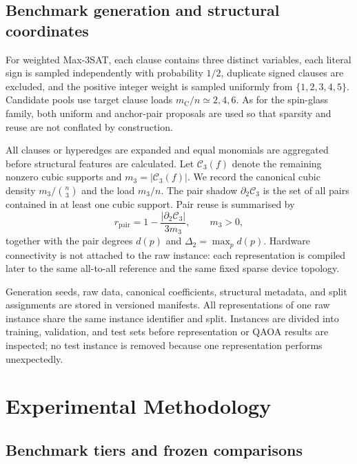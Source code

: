 \documentclass[a4paper,onecolumn,11pt,unpublished]{quantumarticle}
\theoremstyle{remark}
\begin{document}
\subsection{Benchmark generation and structural coordinates}
\label{sec:benchmark-generation}

For weighted Max-3SAT, each clause contains three distinct variables, each
literal sign is sampled independently with probability $1/2$, duplicate signed
clauses are excluded, and the positive integer weight is sampled uniformly from
$\{1,2,3,4,5\}$.  Candidate pools use target clause loads
$m_{\mathrm C}/n\simeq2,4,6$.  As for the spin-glass family, both uniform and
anchor-pair proposals are used so that sparsity and reuse are not conflated by
construction.

All clauses or hyperedges are expanded and equal monomials are aggregated
before structural features are calculated.  Let $\mathcal C_3(f)$ denote the
remaining nonzero cubic supports and $m_3=|\mathcal C_3(f)|$.  We record the
canonical cubic density $m_3/\binom{n}{3}$ and the load $m_3/n$.  The pair shadow
$\partial_2\mathcal C_3$ is the set of all pairs contained in at least one
cubic support.  Pair reuse is summarised by
\begin{equation}
  r_{\mathrm{pair}}
  =1-\frac{|\partial_2\mathcal C_3|}{3m_3},
  \qquad m_3>0,
  \label{eq:pair-reuse-score}
\end{equation}
together with the pair degrees $d(p)$ and
$\Delta_2=\max_p d(p)$.  Hardware connectivity is not attached to the raw
instance: each representation is compiled later to the same all-to-all
reference and the same fixed sparse device topology.

Generation seeds, raw data, canonical coefficients, structural metadata, and
split assignments are stored in versioned manifests.  All representations of
one raw instance share the same instance identifier and split.  Instances are
divided into training, validation, and test sets before representation or QAOA
results are inspected; no test instance is removed because one representation
performs unexpectedly.
\section{Experimental Methodology}
\label{sec:experiments}

\subsection{Benchmark tiers and frozen comparisons}
\label{sec:benchmark-tiers}
\end{document}

